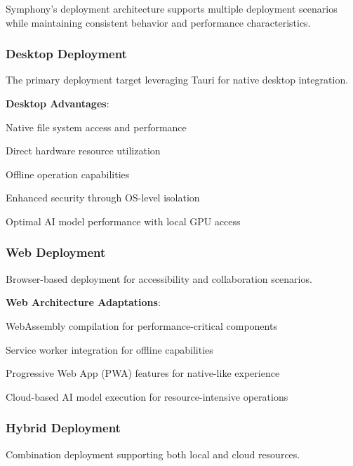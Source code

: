 Symphony's deployment architecture supports multiple deployment scenarios while maintaining consistent behavior and performance characteristics.

\subsubsection*{Desktop Deployment}

The primary deployment target leveraging Tauri for native desktop integration.

\begin{successbox}
\textbf{Desktop Advantages}:
\begin{compactlist}
    \item Native file system access and performance
    \item Direct hardware resource utilization
    \item Offline operation capabilities
    \item Enhanced security through OS-level isolation
    \item Optimal AI model performance with local GPU access
\end{compactlist}
\end{successbox}

\subsubsection*{Web Deployment}

Browser-based deployment for accessibility and collaboration scenarios.

\textbf{Web Architecture Adaptations}:
\begin{compactlist}
    \item WebAssembly compilation for performance-critical components
    \item Service worker integration for offline capabilities
    \item Progressive Web App (PWA) features for native-like experience
    \item Cloud-based AI model execution for resource-intensive operations
\end{compactlist}

\subsubsection*{Hybrid Deployment}

Combination deployment supporting both local and cloud resources.

